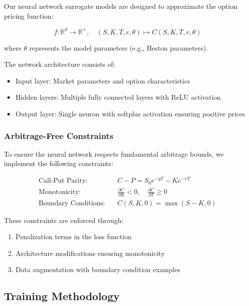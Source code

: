 \documentclass[12pt,a4paper]{article}
\begin{document}
Our neural network surrogate models are designed to approximate the option pricing function:

\begin{equation}
f: \mathbb{R}^d \rightarrow \mathbb{R}^+, \quad (S, K, T, r, \theta) \mapsto C(S, K, T, r, \theta)
\end{equation}

where $\theta$ represents the model parameters (e.g., Heston parameters).

The network architecture consists of:

\begin{itemize}
    \item Input layer: Market parameters and option characteristics
    \item Hidden layers: Multiple fully connected layers with ReLU activation
    \item Output layer: Single neuron with softplus activation ensuring positive prices
\end{itemize}

\subsubsection{Arbitrage-Free Constraints}

To ensure the neural network respects fundamental arbitrage bounds, we implement the following constraints:

\begin{align}
\text{Call-Put Parity:} \quad &C - P = S_0 e^{-qT} - Ke^{-rT} \\
\text{Monotonicity:} \quad &\frac{\partial C}{\partial K} < 0, \quad \frac{\partial C}{\partial T} \geq 0 \\
\text{Boundary Conditions:} \quad &C(S, K, 0) = \max(S - K, 0)
\end{align}

These constraints are enforced through:
\begin{enumerate}
    \item Penalization terms in the loss function
    \item Architecture modifications ensuring monotonicity
    \item Data augmentation with boundary condition examples
\end{enumerate}

\subsection{Training Methodology}
\end{document}
